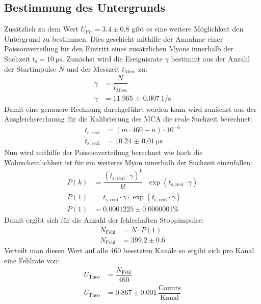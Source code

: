 \subsection{Bestimmung des Untergrunds}
Zusätzlich zu dem Wert $U_\mathrm{Fit}=3.4\pm0.8$ gibt es eine weitere Möglichkeit den Untergrund zu bestimmen. Dies geschieht mithilfe der Annahme einer Poissonverteilung für den Eintritt eines zusätzlichen Myons innerhalb der Suchzeit $t_\mathrm{s}=\SI{10}{\micro\second}$. Zunächst wird die Ereignisrate $\gamma$ bestimmt aus der Anzahl der Startimpulse $N$ und der Messzeit $t_\mathrm{Mess}$ zu:
\begin{align*}
	\gamma &= \dfrac{N}{t_\mathrm{Mess}} \\
	\gamma &= \SI{11.965(7)}{1\per\second}
\end{align*}
Damit eine genauere Rechnung durchgeführt werden kann wird zunächst aus der Ausgleichsrechnung für die Kalibrierung des MCA die reale Suchzeit berechnet:
\begin{align*}
	t_\mathrm{s,real}&=(m\cdot 460 + n) \cdot 10^{-6} \\
	t_\mathrm{s,real}&=\SI{10.24(1)}{\micro\second}
\end{align*}
Nun wird mithilfe der Poissonverteilung berechnet wie hoch die Wahrscheinlichkeit ist für ein weiteres Myon innerhalb der Suchzeit einzufallen:
\begin{align*}
	P(k)&=\dfrac{(t_\mathrm{s,real}\cdot\gamma)^k}{k!}\cdot\exp(t_\mathrm{s,real}\cdot\gamma) \\
	P(1)&=t_\mathrm{s,real}\cdot\gamma\cdot\exp(t_\mathrm{s,real}\cdot\gamma) \\
	P(1)&=0.0001225\pm0.0000001 \%
\end{align*}
Damit ergibt sich für die Anzahl der fehlerhaften Stoppimpulse:
\begin{align*}
	N_\mathrm{Fehl}&= N\cdot P(1) \\
	N_\mathrm{Fehl}&= 399.2\pm0.6
\end{align*}
Verteilt man diesen Wert auf alle 460 besetzten Kanäle so ergibt sich pro Kanal eine Fehlrate von:
\begin{align*}
	U_\mathrm{Theo}&=\dfrac{N_\mathrm{Fehl}}{460} \\
	U_\mathrm{Theo}&=0.867\pm0.001 \, \dfrac{\mathrm{Counts}}{\mathrm{Kanal}}
\end{align*}
